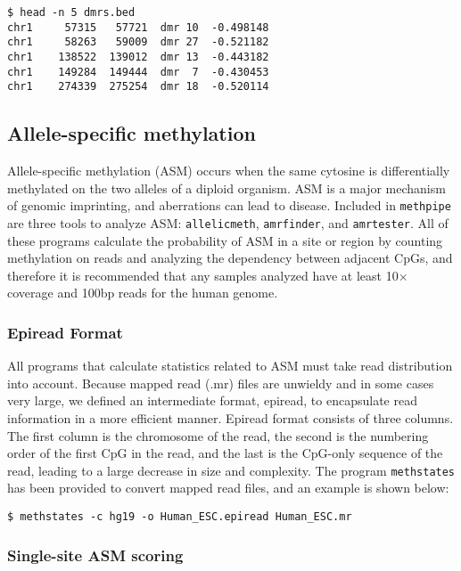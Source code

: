 \documentclass[10pt]{article}
\newcommand{\prog}[1]{\texttt{#1}}
\begin{document}
{\small{%
\begin{verbatim}
$ head -n 5 dmrs.bed
chr1	 57315	 57721	dmr	10	-0.498148
chr1	 58263	 59009	dmr	27	-0.521182
chr1	138522	139012	dmr	13	-0.443182
chr1	149284	149444	dmr	 7	-0.430453
chr1	274339	275254	dmr	18	-0.520114
\end{verbatim}%

\subsection{Allele-specific methylation}

Allele-specific methylation (ASM) occurs when the same cytosine is
differentially methylated on the two alleles of a diploid organism.
ASM is a major mechanism of genomic imprinting, and aberrations can
lead to disease. Included in \prog{methpipe} are three tools to
analyze ASM: \prog{allelicmeth}, \prog{amrfinder}, and \prog{amrtester}.
All of these programs calculate the probability of ASM in a site or
region by counting methylation on reads and analyzing the dependency
between adjacent CpGs, and therefore it is recommended that any samples
analyzed have at least 10$\times$ coverage and 100bp reads for the human
genome.

\subsubsection{Epiread Format}

All programs that calculate statistics related to ASM must take read
distribution into account. Because mapped read (.mr) files are unwieldy
and in some cases very large, we defined an intermediate format, epiread,
to encapsulate read information in a more efficient manner. Epiread format
consists of three columns. The first column is the chromosome of the read,
the second is the numbering order of the first CpG in the read, and the
last is the CpG-only sequence of the read, leading to a large decrease in
size and complexity. The program \prog{methstates} has been provided to
convert mapped read files, and an example is shown below:

\begin{verbatim}
$ methstates -c hg19 -o Human_ESC.epiread Human_ESC.mr 
\end{verbatim}


\subsubsection{Single-site ASM scoring}
\label{sec:allelic_scores}

}}
\end{document}
